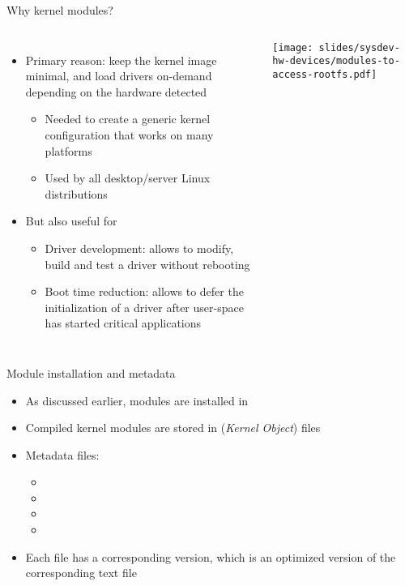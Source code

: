 \begin{frame}{Why kernel modules?}
  \begin{columns}[T]
    \begin{itemize}
    \item Primary reason: keep the kernel image minimal, and load
      drivers on-demand depending on the hardware detected
      \begin{itemize}
      \item Needed to create a generic kernel configuration that works
        on many platforms
      \item Used by all desktop/server Linux distributions
      \end{itemize}
    \item But also useful for
      \begin{itemize}
      \item Driver development: allows to modify, build and test a
        driver without rebooting
      \item Boot time reduction: allows to defer the initialization of
        a driver after user-space has started critical applications
      \end{itemize}
    \end{itemize}
    \texttt{[image: slides/sysdev-hw-devices/modules-to-access-rootfs.pdf]}
  \end{columns}
\end{frame}

\begin{frame}{Module installation and metadata}
  \begin{itemize}
  \item As discussed earlier, modules are installed in
  \item Compiled kernel modules are stored in  ({\em Kernel Object}) files
  \item Metadata files:
    \begin{itemize}
    \item {}
    \item {}
    \item {}
    \item {}
    \end{itemize}
  \item Each file has a corresponding  version, which is an optimized version of the corresponding text file
  \end{itemize}
\end{frame}

